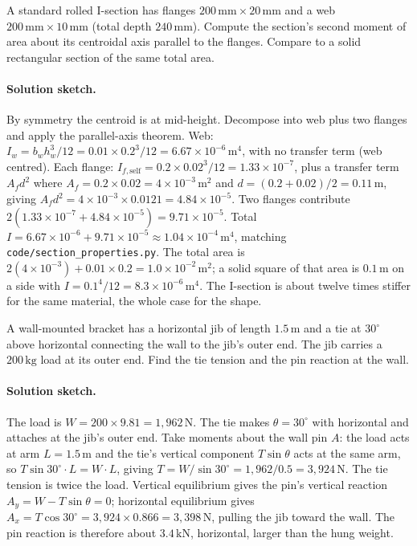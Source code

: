 \begin{exercise}
A standard rolled I-section has flanges $200\,\si{\milli\meter} \times
20\,\si{\milli\meter}$ and a web $200\,\si{\milli\meter} \times 10\,
\si{\milli\meter}$ (total depth $240\,\si{\milli\meter}$). Compute
the section's second moment of area about its centroidal axis
parallel to the flanges. Compare to a solid rectangular section of
the same total area.

\paragraph{Solution sketch.} By symmetry the centroid is at
mid-height. Decompose into web plus two flanges and apply the
parallel-axis theorem. Web: $I_w = b_w h_w^3 / 12 =
0.01 \times 0.2^3 / 12 = 6.67 \times 10^{-6}\,\si{\meter\tothe{4}}$,
with no transfer term (web centred). Each flange:
$I_{f,\text{self}} = 0.2 \times 0.02^3/12 = 1.33 \times 10^{-7}$, plus a
transfer term $A_f d^2$ where $A_f = 0.2 \times 0.02 = 4 \times
10^{-3}\,\si{\meter\squared}$ and $d = (0.2 + 0.02)/2 = 0.11\,\si{
\meter}$, giving $A_f d^2 = 4 \times 10^{-3} \times 0.0121 =
4.84 \times 10^{-5}$. Two flanges contribute
$2(1.33 \times 10^{-7} + 4.84 \times 10^{-5}) = 9.71 \times 10^{-5}$.
Total $I = 6.67 \times 10^{-6} + 9.71 \times 10^{-5} \approx
1.04 \times 10^{-4}\,\si{\meter\tothe{4}}$, matching
\texttt{code/section\_properties.py}. The total area is
$2(4 \times 10^{-3}) + 0.01 \times 0.2 = 1.0 \times 10^{-2}\,\si{
\meter\squared}$; a solid square of that area is $0.1\,\si{\meter}$ on a
side with $I = 0.1^4/12 = 8.3 \times 10^{-6}\,\si{\meter\tothe{4}}$. The
I-section is about twelve times stiffer for the same material, the whole
case for the shape.
\end{exercise}

\begin{exercise}
A wall-mounted bracket has a horizontal jib of length $1.5\,\si{
\meter}$ and a tie at $30^{\circ}$ above horizontal connecting the
wall to the jib's outer end. The jib carries a $200\,\si{\kilogram}$
load at its outer end. Find the tie tension and the pin reaction at
the wall.

\paragraph{Solution sketch.} The load is $W = 200 \times 9.81 =
1{,}962\,\text{N}$. The tie makes $\theta = 30^{\circ}$ with horizontal
and attaches at the jib's outer end. Take moments about the wall pin
$A$: the load acts at arm $L = 1.5\,\si{\meter}$ and the tie's vertical
component $T \sin\theta$ acts at the same arm, so
$T \sin 30^{\circ} \cdot L = W \cdot L$, giving
$T = W / \sin 30^{\circ} = 1{,}962 / 0.5 = 3{,}924\,\text{N}$. The tie
tension is twice the load. Vertical equilibrium gives the pin's vertical
reaction $A_y = W - T \sin\theta = 0$; horizontal equilibrium gives
$A_x = T \cos 30^{\circ} = 3{,}924 \times 0.866 = 3{,}398\,\text{N}$,
pulling the jib toward the wall. The pin reaction is therefore about
$3.4\,\text{kN}$, horizontal, larger than the hung weight.
\end{exercise}

